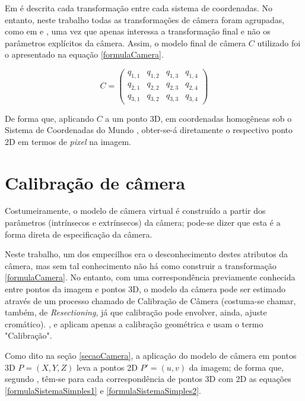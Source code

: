 		Em \cite{foto3D} é descrita cada transformação entre cada sistema de coordenadas. No entanto, neste trabalho todas as transformações de câmera foram agrupadas, como em \cite{juizVirtual} e \cite{fundCompGraf}, uma vez que apenas interessa a transformação final e não os parâmetros explícitos da câmera. Assim, o modelo final de câmera $C$ utilizado foi o apresentado na equação \ref{formulaCamera}.
		
		\begin{equation}
			C = \begin{pmatrix}
						q_{1,1} & q_{1,2} & q_{1,3} & q_{1,4} \\
						q_{2,1} & q_{2,2} & q_{2,3} & q_{2,4} \\
						q_{3,1} & q_{3,2} & q_{3,3} & q_{3,4}
					\end{pmatrix}
			\label{formulaCamera}
		\end{equation}
		
		De forma que, aplicando $C$ a um ponto 3D, em coordenadas homogêneas \cite{fundCompGraf2} sob o Sistema de Coordenadas do Mundo \cite{foto3D}, obter-se-á diretamente o respectivo ponto 2D em termos de \textit{pixel} na imagem.
	
	\section{Calibração de câmera}
		\label{secaoCalibracao}
	
		Costumeiramente, o modelo de câmera virtual é construído a partir dos parâmetros (intrínsecos e extrínsecos) \cite{fundCompGraf} da câmera; pode-se dizer que esta é a forma direta de especificação da câmera. 
		
		Neste trabalho, um dos empecilhos era o desconhecimento destes atributos da câmera, mas sem tal conhecimento não há como construir a transformação \ref{formulaCamera}. No entanto, com uma correspondência previamente conhecida entre pontos da imagem e pontos 3D, o modelo da câmera pode ser estimado através de um processo chamado de Calibração de Câmera (costuma-se chamar, também, de \textit{Resectioning}, já que calibração pode envolver, ainda, ajuste cromático). \cite{juizVirtual}, \cite{szenbergDoutorado} e \cite{lectureCameraCalibration} aplicam apenas a calibração geométrica e usam o termo "Calibração".
		
		Como dito na seção \ref{secaoCamera}, a aplicação do modelo de câmera em pontos 3D $P = (X, Y, Z)$ leva a pontos 2D $P' = (u, v)$ da imagem; de forma que, segundo \cite{juizVirtual}, têm-se para cada correspondência de pontos 3D com 2D as equações \ref{formulaSistemaSimples1} e \ref{formulaSistemaSimples2}.
	
